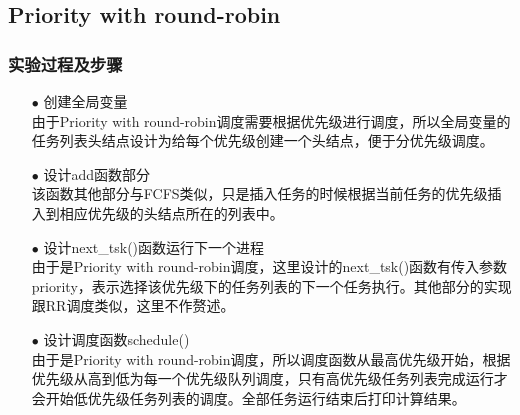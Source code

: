 \documentclass{article}
\begin{document}
\subsection{Priority with round-robin}
\subsubsection{实验过程及步骤}
\begin{itemize}
\item[$\bullet$]创建全局变量\\
由于Priority with round-robin调度需要根据优先级进行调度，所以全局变量的任务列表头结点设计为给每个优先级创建一个头结点，便于分优先级调度。
\item[$\bullet$]设计add函数部分\\
该函数其他部分与FCFS类似，只是插入任务的时候根据当前任务的优先级插入到相应优先级的头结点所在的列表中。
\item[$\bullet$]设计next\_tsk()函数运行下一个进程\\
由于是Priority with round-robin调度，这里设计的next\_tsk()函数有传入参数priority，表示选择该优先级下的任务列表的下一个任务执行。其他部分的实现跟RR调度类似，这里不作赘述。
\item[$\bullet$]设计调度函数schedule()\\
由于是Priority with round-robin调度，所以调度函数从最高优先级开始，根据优先级从高到低为每一个优先级队列调度，只有高优先级任务列表完成运行才会开始低优先级任务列表的调度。全部任务运行结束后打印计算结果。
\end{itemize}
\end{document}
